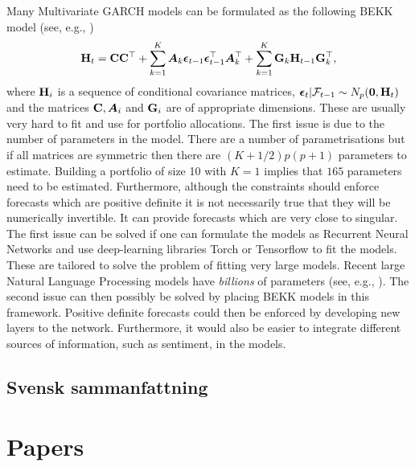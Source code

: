 \documentclass[12pt, twoside]{book}\usepackage{knitr}
\begin{document}
Many Multivariate GARCH models can be formulated as the following BEKK model (see, e.g., \citet{engle1995multivariate})
\begin{equation}\label{eqn:BEKK}
  \mathbf{H}_t = \mathbf{C} \mathbf{C}^\top + \sum_{k=1}^K \mbox{\boldmath$A$}_k \boldsymbol{\epsilon}_{t-1}\boldsymbol{\epsilon}_{t-1}^\top \mbox{\boldmath$A$}_k^\top + \sum_{k=1}^K \mathbf{G}_k \mathbf{H}_{t-1}\mathbf{G}_k^\top,
\end{equation}
where $\mathbf{H}_i$ is a sequence of conditional covariance matrices, $\boldsymbol{\epsilon}_t | \mathcal{F}_{t-1} \sim N_p(\mathbf{0}, \mathbf{H}_t)$ and the matrices $\mathbf{C}, \mbox{\boldmath$A$}_i$ and $\mathbf{G}_i$ are of appropriate dimensions.
These are usually very hard to fit and use for portfolio allocations. 
The first issue is due to the number of parameters in the model.
There are a number of parametrisations but if all matrices are symmetric then there are $(K+1/2)p(p+1)$ parameters to estimate. 
Building a portfolio of size 10 with $K=1$ implies that $165$ parameters need to be estimated.
Furthermore, although the constraints should enforce forecasts which are positive definite it is not necessarily true that they will be numerically invertible.
It can provide forecasts which are very close to singular.
The first issue can be solved if one can formulate the models as Recurrent Neural Networks and use deep-learning libraries Torch or Tensorflow to fit the models. 
These are tailored to solve the problem of fitting very large models.
Recent large Natural Language Processing models have \textit{billions} of parameters (see, e.g., \citet{brown2020language}). 
The second issue can then possibly be solved by placing BEKK models in this framework.
Positive definite forecasts could then be enforced by developing new layers to the network. 
Furthermore, it would also be easier to integrate different sources of information, such as sentiment, in the models.

\chapter{Svensk sammanfattning}


\backmatterSU

\printbibliography[keyword={ref_list}]
\part{Papers}
\end{document}
